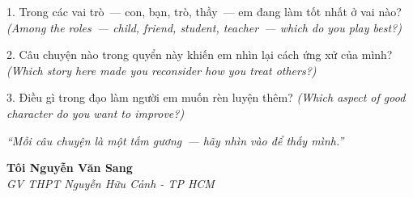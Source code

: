 \begin{tuhocnhanh}
1. Trong các vai trò~--- con, bạn, trò, thầy~--- em đang làm tốt nhất ở vai nào? \textit{(Among the roles~--- child, friend, student, teacher~--- which do you play best?)}

2. Câu chuyện nào trong quyển này khiến em nhìn lại cách ứng xử của mình? \textit{(Which story here made you reconsider how you treat others?)}

3. Điều gì trong đạo làm người em muốn rèn luyện thêm? \textit{(Which aspect of good character do you want to improve?)}
\end{tuhocnhanh}

\begin{center}
\textit{\color{truyengold}``Mỗi câu chuyện là một tấm gương~--- hãy nhìn vào để thấy mình.''}
\end{center}

\begin{flushright}
\textbf{Tôi Nguyễn Văn Sang}\\
\textit{GV THPT Nguyễn Hữu Cảnh - TP HCM}
\end{flushright}

\ngancach
